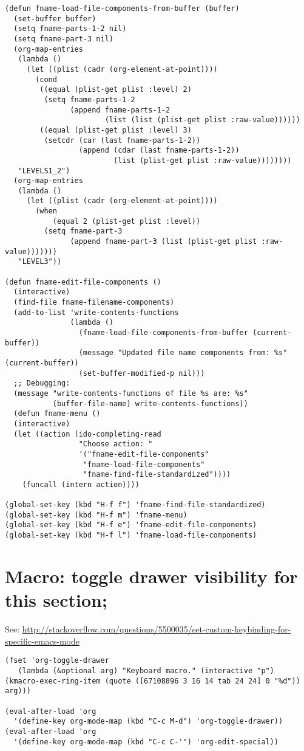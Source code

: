 \documentclass[10pt]{article}
\begin{document}
\begin{verbatim}
(defun fname-load-file-components-from-buffer (buffer)
  (set-buffer buffer)
  (setq fname-parts-1-2 nil)
  (setq fname-part-3 nil)
  (org-map-entries
   (lambda ()
     (let ((plist (cadr (org-element-at-point))))
       (cond
        ((equal (plist-get plist :level) 2)
         (setq fname-parts-1-2
               (append fname-parts-1-2
                       (list (list (plist-get plist :raw-value))))))
        ((equal (plist-get plist :level) 3)
         (setcdr (car (last fname-parts-1-2))
                 (append (cdar (last fname-parts-1-2))
                         (list (plist-get plist :raw-value))))))))
   "LEVELS1_2")
  (org-map-entries
   (lambda ()
     (let ((plist (cadr (org-element-at-point))))
       (when
           (equal 2 (plist-get plist :level))
         (setq fname-part-3
               (append fname-part-3 (list (plist-get plist :raw-value)))))))
   "LEVEL3"))

(defun fname-edit-file-components ()
  (interactive)
  (find-file fname-filename-components)
  (add-to-list 'write-contents-functions
               (lambda ()
                 (fname-load-file-components-from-buffer (current-buffer))
                 (message "Updated file name components from: %s" (current-buffer))
                 (set-buffer-modified-p nil)))
  ;; Debugging:
  (message "write-contents-functions of file %s are: %s"
           (buffer-file-name) write-contents-functions))
  (defun fname-menu ()
  (interactive)
  (let ((action (ido-completing-read
                 "Choose action: "
                 '("fname-edit-file-components"
                  "fname-load-file-components"
                  "fname-find-file-standardized"))))
    (funcall (intern action))))

(global-set-key (kbd "H-f f") 'fname-find-file-standardized)
(global-set-key (kbd "H-f m") 'fname-menu)
(global-set-key (kbd "H-f e") 'fname-edit-file-components)
(global-set-key (kbd "H-f l") 'fname-load-file-components)
\end{verbatim}
\section{Macro: toggle drawer visibility for this section;}
\label{sec-19}


See: \url{http://stackoverflow.com/questions/5500035/set-custom-keybinding-for-specific-emacs-mode}

\begin{verbatim}
(fset 'org-toggle-drawer
   (lambda (&optional arg) "Keyboard macro." (interactive "p") (kmacro-exec-ring-item (quote ([67108896 3 16 14 tab 24 24] 0 "%d")) arg)))

(eval-after-load 'org
  '(define-key org-mode-map (kbd "C-c M-d") 'org-toggle-drawer))
(eval-after-load 'org
  '(define-key org-mode-map (kbd "C-c C-'") 'org-edit-special))
\end{verbatim}
\end{document}
